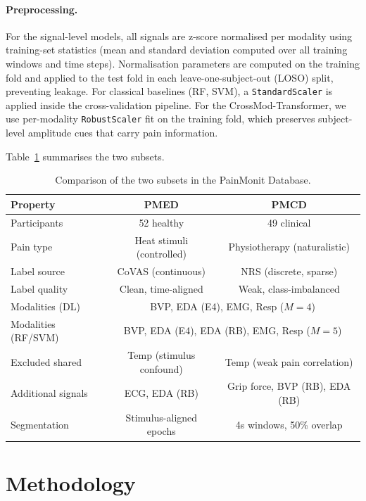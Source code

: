 \documentclass{article}
\begin{document}
\paragraph{Preprocessing.}
For the signal-level models, all signals are z-score normalised per modality using training-set statistics (mean and standard deviation computed over all training windows and time steps). Normalisation parameters are computed on the training fold and applied to the test fold in each leave-one-subject-out (LOSO) split, preventing leakage. For classical baselines (RF, SVM), a \texttt{StandardScaler} is applied inside the cross-validation pipeline. For the CrossMod-Transformer, we use per-modality \texttt{RobustScaler} fit on the training fold, which preserves subject-level amplitude cues that carry pain information.

Table~\ref{tab:dataset_comparison} summarises the two subsets.

\begin{table}[t]
\centering
\caption{Comparison of the two subsets in the PainMonit Database.}
\label{tab:dataset_comparison}
\small
\begin{tabular}{@{}lcc@{}}
\toprule
\textbf{Property} & \textbf{PMED} & \textbf{PMCD} \\
\midrule
Participants & 52 healthy & 49 clinical \\
Pain type & Heat stimuli (controlled) & Physiotherapy (naturalistic) \\
Label source & CoVAS (continuous) & NRS (discrete, sparse) \\
Label quality & Clean, time-aligned & Weak, class-imbalanced \\
Modalities (DL)     & \multicolumn{2}{c}{BVP, EDA (E4), EMG, Resp ($M=4$)} \\
Modalities (RF/SVM) & \multicolumn{2}{c}{BVP, EDA (E4), EDA (RB), EMG, Resp ($M=5$)} \\
Excluded shared & Temp (stimulus confound) & Temp (weak pain correlation) \\
Additional signals & ECG, EDA (RB) & Grip force, BVP (RB), EDA (RB) \\
Segmentation & Stimulus-aligned epochs & 4s windows, 50\% overlap \\
\bottomrule
\end{tabular}
\end{table}

\section{Methodology}
\end{document}
